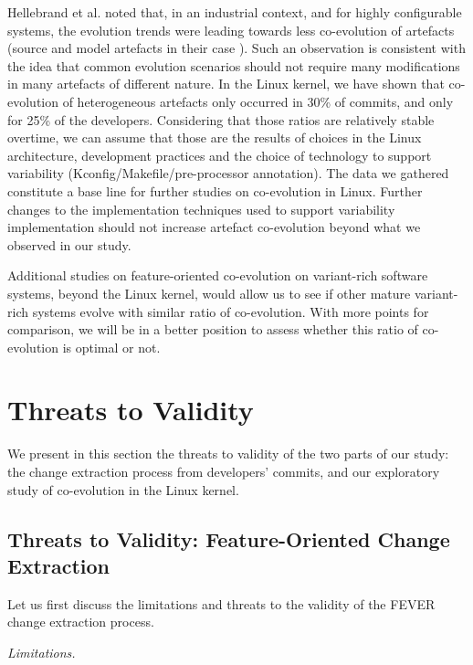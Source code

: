 Hellebrand et al. noted that, in an industrial context, and for highly configurable systems, 
the evolution trends were leading towards less co-evolution of artefacts (source and model artefacts in their case \citep{hellebrand_coevolution_2014}).
Such an observation is consistent with the idea that common evolution scenarios should not require many modifications in many artefacts of different nature.
In the Linux kernel, we have shown that co-evolution of heterogeneous artefacts only occurred in 30\% of commits, and only for 25\% of the developers.
Considering that those ratios are relatively stable overtime, we can assume that those are the results of choices in the Linux architecture, development practices and the choice of technology to support variability (Kconfig/Makefile/pre-processor annotation). 
The data we gathered constitute a base line for further studies on co-evolution in Linux. 
Further changes to the implementation techniques used to support variability implementation should not increase artefact co-evolution beyond what we observed in our study.

Additional studies on feature-oriented co-evolution on variant-rich software systems, beyond the Linux kernel, would allow us to see
if other mature variant-rich systems evolve with similar ratio of co-evolution. With more points for comparison, we will be in a better position
to assess whether this ratio of co-evolution is optimal or not.

\section{Threats to Validity}
\label{sec:discussion}

We present in this section the threats to validity of the two parts of our study:
the change extraction process from developers' commits, and our exploratory study
of co-evolution in the Linux kernel.

\subsection{Threats to Validity: Feature-Oriented Change Extraction}

Let us first discuss the limitations and threats to the validity of the FEVER change extraction process.

\textit{Limitations.}

